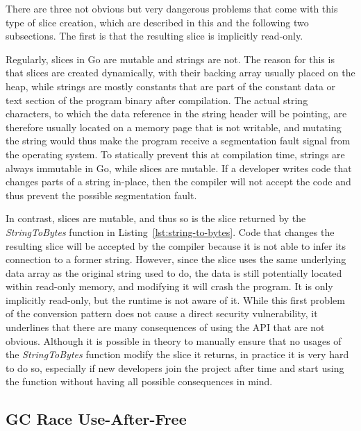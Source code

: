 There are three not obvious but very dangerous problems that come with this type of slice creation, which are described
in this and the following two subsections.
The first is that the resulting slice is implicitly read-only.

Regularly, slices in Go are mutable and strings are not.
The reason for this is that slices are created dynamically, with their backing array usually placed on the heap, while
strings are mostly constants that are part of the constant data or text section of the program binary after compilation.
The actual string characters, to which the data reference in the string header will be pointing, are therefore usually
located on a memory page that is not writable, and mutating the string would thus make the program receive a
segmentation fault signal from the operating system.
To statically prevent this at compilation time, strings are always immutable in Go, while slices are mutable.
If a developer writes code that changes parts of a string in-place, then the compiler will not accept the code and thus
prevent the possible segmentation fault.

In contrast, slices are mutable, and thus so is the slice returned by the \textit{StringToBytes} function in
Listing~\ref{lst:string-to-bytes}.
Code that changes the resulting slice will be accepted by the compiler because it is not able to infer its connection to
a former string.
However, since the slice uses the same underlying data array as the original string used to do, the data is still
potentially located within read-only memory, and modifying it will crash the program.
It is only implicitly read-only, but the runtime is not aware of it.
While this first problem of the conversion pattern does not cause a direct security vulnerability, it underlines that
there are many consequences of using the \unsafe{} \acrshort{API} that are not obvious.
Although it is possible in theory to manually ensure that no usages of the \textit{StringToBytes} function modify the
slice it returns, in practice it is very hard to do so, especially if new developers join the project after time and
start using the function without having all possible consequences in mind.



\subsection{GC Race Use-After-Free}\label{subsec:unsafe-security-problems:slice-casts:gc-race}

